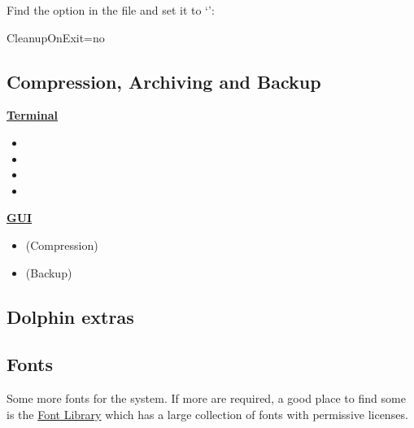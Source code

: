 \begin{blocksection}
	Find the  option in the file and set it to `':
	\vspace*{1em}
	\begin{codeblock}
		CleanupOnExit=no
	\end{codeblock}
\end{blocksection}

\subsection{Compression, Archiving and Backup}

\begin{varwidth}[t]{.5\textwidth}
\textbf{\textcolor{textgrey}{\uline{Terminal}}}
	\begin{itemize}[noitemsep,topsep=0pt,leftmargin=*]
		\item {}
		\item {}
		\item {}
		\item {}
	\end{itemize}
\end{varwidth}
\hspace{4em}
\begin{varwidth}[t]{.5\textwidth}
	\textbf{\textcolor{textgrey}{\uline{GUI}}}
	\begin{itemize}[noitemsep,topsep=0pt,leftmargin=*]
		\item {} (Compression)
		\item {} (Backup)
	\end{itemize}
\end{varwidth}

\subsection{Dolphin extras}


\subsection{Fonts}

Some more fonts for the system. If more are required, a good place to find some is the \href{https://fontlibrary.org/}{Font Library} which has a large collection of fonts with permissive licenses.

